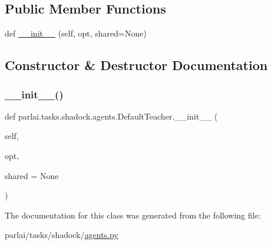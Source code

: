\subsection*{Public Member Functions}
\begin{DoxyCompactItemize}
\item 
def \hyperlink{classparlai_1_1tasks_1_1shadock_1_1agents_1_1DefaultTeacher_ac3629b5cf2040dcb6172c276328a3b45}{\+\_\+\+\_\+init\+\_\+\+\_\+} (self, opt, shared=None)
\end{DoxyCompactItemize}


\subsection{Constructor \& Destructor Documentation}
\mbox{\label{classparlai_1_1tasks_1_1shadock_1_1agents_1_1DefaultTeacher_ac3629b5cf2040dcb6172c276328a3b45}} 
\subsubsection{\texorpdfstring{\+\_\+\+\_\+init\+\_\+\+\_\+()}{\_\_init\_\_()}}
{\footnotesize\ttfamily def parlai.\+tasks.\+shadock.\+agents.\+Default\+Teacher.\+\_\+\+\_\+init\+\_\+\+\_\+ (\begin{DoxyParamCaption}\item[{}]{self,  }\item[{}]{opt,  }\item[{}]{shared = {\ttfamily None} }\end{DoxyParamCaption})}



The documentation for this class was generated from the following file\+:\begin{DoxyCompactItemize}
\item 
parlai/tasks/shadock/\hyperlink{parlai_2tasks_2shadock_2agents_8py}{agents.\+py}\end{DoxyCompactItemize}
